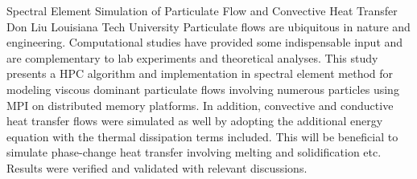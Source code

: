 \begin{addmargin}[2em]{0em}
\vspace{1.5ex}
\abs
{Spectral Element Simulation of Particulate Flow and Convective Heat Transfer}
{Don Liu}
{Louisiana Tech University}
{Particulate flows are ubiquitous in nature and engineering. Computational studies have provided some indispensable input and are complementary to lab experiments and theoretical analyses. This study presents a HPC algorithm and implementation in spectral element method for modeling viscous dominant particulate flows involving numerous particles using MPI on distributed memory platforms. In addition, convective and conductive heat transfer flows were simulated as well by adopting the additional energy equation with the thermal dissipation terms included. This will be beneficial to simulate phase-change heat transfer involving melting and solidification etc. Results were verified and validated with relevant discussions.}


\end{addmargin}
